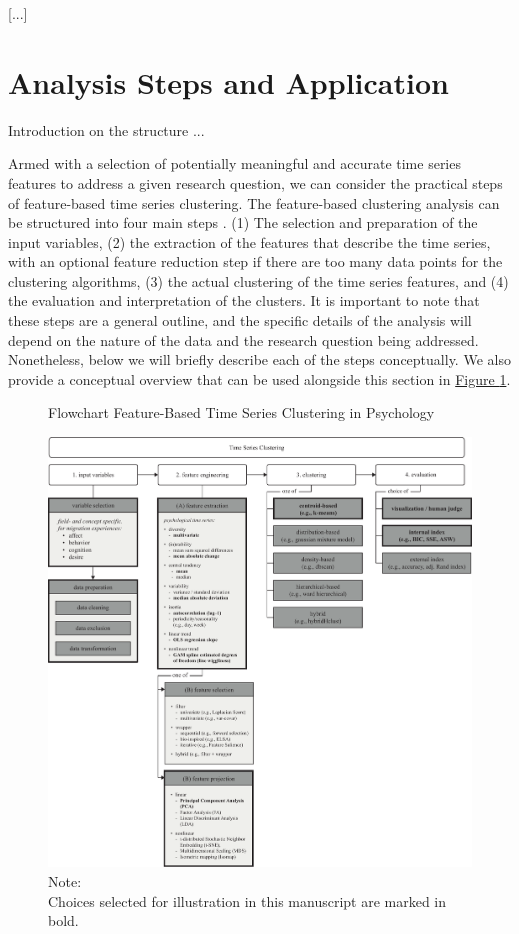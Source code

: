 \documentclass[man, 12pt, a4paper, mask, floatsintext]{apa7}
\theoremstyle{break}
\theoremstyle{plain}
\newcommand{\fgrref}[2][]{\hyperref[#2]{Figure \ref*{#2}#1}}
\begin{document}
[...]

\section{Analysis Steps and Application} 

Introduction on the structure ...

Armed with a selection of potentially meaningful and accurate time series features to address a given research question, we can consider the practical steps of feature-based time series clustering. The feature-based clustering analysis can be structured into four main steps \citep{rasanen2009, wang2006}. (1) The selection and preparation of the input variables, (2) the extraction of the features that describe the time series, with an optional feature reduction step if there are too many data points for the clustering algorithms, (3) the actual clustering of the time series features, and (4) the evaluation and interpretation of the clusters. It is important to note that these steps are a general outline, and the specific details of the analysis will depend on the nature of the data and the research question being addressed. Nonetheless, below we will briefly describe each of the steps conceptually. We also provide a conceptual overview that can be used alongside this section in \fgrref{fig:TSCFlow}.

\begin{figure}[!ht] %
  \caption{Flowchart Feature-Based Time Series Clustering in Psychology}
  \label{fig:TSCFlow}
  \centering\includegraphics[width=\textwidth]{figures/TS Cluster Flow/TimeSeriesClusterFlowSelection.pdf}
  \caption*{Note: \\
  Choices selected for illustration in this manuscript are marked in bold.}
\end{figure}
\end{document}
